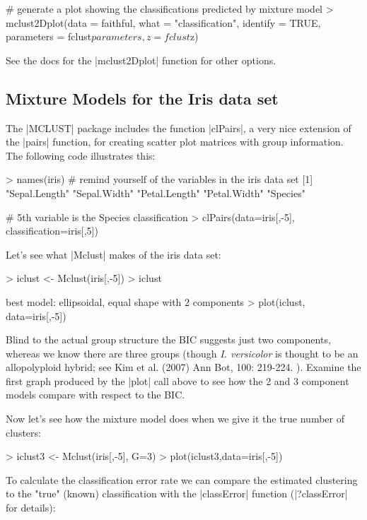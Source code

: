 \documentclass[10pt,letterpaper]{article}
\begin{document}
\begin{Code}
# generate a plot showing the classifications predicted by mixture model    
> mclust2Dplot(data = faithful, what = "classification", identify = TRUE, 
    parameters = fclust$parameters, z = fclust$z)    
\end{Code}

See the docs for the |mclust2Dplot| function for other options.

\subsection*{Mixture Models for the Iris data set}

The |MCLUST| package includes the function |clPairs|, a very nice extension of the |pairs| function, for creating scatter plot matrices with group information. The following code illustrates this:

\begin{Code}
> names(iris) # remind yourself of the variables in the iris data set
[1] "Sepal.Length" "Sepal.Width"  "Petal.Length" "Petal.Width"  "Species"    

# 5th variable is the Species classification
> clPairs(data=iris[,-5], classification=iris[,5]) 
\end{Code}

Let's see what |Mclust| makes of the iris data set:

\begin{Code}
> iclust <- Mclust(iris[,-5])
> iclust

 best model: ellipsoidal, equal shape with 2 components
> plot(iclust, data=iris[,-5])    
\end{Code}

Blind to the actual group structure the BIC suggests just two components, whereas we know there are three groups (though \textit{I. versicolor} is thought to be an allopolyploid hybrid; see Kim et al. (2007) Ann Bot, 100: 219-224. ). Examine the first graph produced by the |plot| call above to see how the 2 and 3 component models compare with respect to the BIC.

Now let's see how the mixture model does when we give it the true number of clusters:

\begin{Code}
> iclust3 <- Mclust(iris[,-5], G=3)
> plot(iclust3,data=iris[,-5])    
\end{Code}

To calculate the classification error rate we can compare the estimated clustering to the "true" (known) classification with the |classError| function (|?classError| for details):
\end{document}
